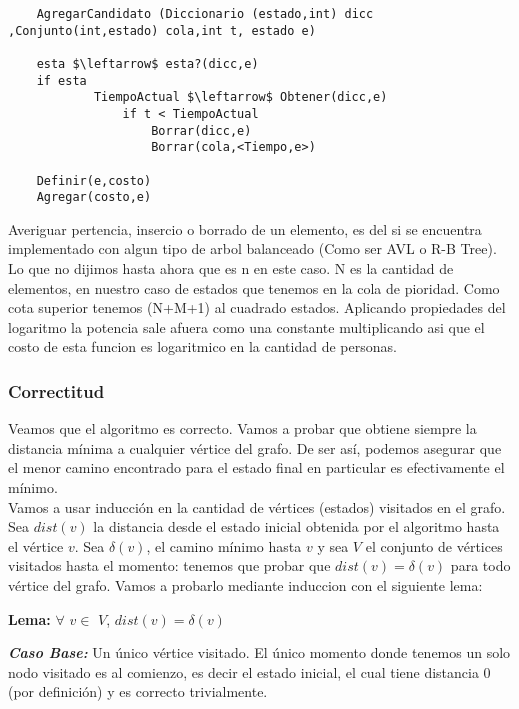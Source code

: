 \lstset{basicstyle=\large}
\begin{lstlisting}
	AgregarCandidato (Diccionario (estado,int) dicc ,Conjunto(int,estado) cola,int t, estado e)

	esta $\leftarrow$ esta?(dicc,e)
	if esta
			TiempoActual $\leftarrow$ Obtener(dicc,e)
				if t < TiempoActual
					Borrar(dicc,e)
					Borrar(cola,<Tiempo,e>)

	Definir(e,costo)
	Agregar(costo,e)

\end{lstlisting}

Averiguar pertencia, insercio o borrado de un elemento, es del si se encuentra implementado con algun tipo de arbol balanceado (Como ser AVL o R-B Tree). Lo que no dijimos hasta ahora que es n en este caso. N es la cantidad de elementos, en nuestro caso de estados que tenemos en la cola de pioridad. Como cota superior tenemos (N+M+1) al cuadrado estados. Aplicando propiedades del logaritmo la potencia sale afuera como una constante multiplicando asi que el costo de esta funcion es logaritmico en la cantidad de personas.


	\subsubsection{Correctitud}

Veamos que el algoritmo es correcto. Vamos a probar que obtiene siempre la distancia mínima a cualquier vértice del grafo. De ser así, podemos asegurar que el menor camino encontrado para el estado final en particular es efectivamente el mínimo.
\\

Vamos a usar inducción en la cantidad de vértices (estados) visitados en el grafo.
Sea $dist(v)$ la distancia desde el estado inicial obtenida por el algoritmo hasta el vértice $v$. Sea $\delta(v)$, el camino mínimo hasta $v$ y sea $V$ el conjunto de vértices visitados hasta el momento: tenemos que probar que $dist(v) = \delta(v)$ para todo vértice del grafo. Vamos a probarlo mediante induccion con el siguiente lema:
\\


\begin{center}
\textbf{Lema: } $\forall$ $v \in$ $V$, $dist(v) = \delta(v)$
\end{center}

\emph{\textbf{Caso Base: }}  Un único vértice visitado. El único momento donde tenemos un solo nodo visitado es al comienzo, es decir
el estado inicial, el cual tiene distancia 0 (por definición) y es correcto trivialmente.
\\

